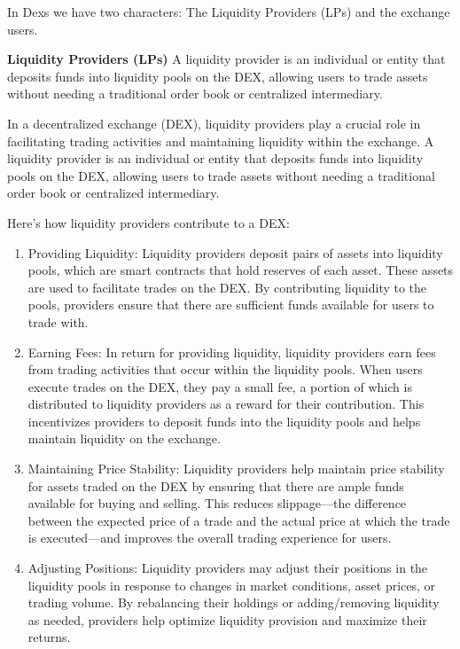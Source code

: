 \noindent In Dexs we have two characters: The Liquidity Providers (LPs) and the exchange users.

\textbf{Liquidity Providers (LPs)} A liquidity provider is an individual or entity that deposits funds into liquidity pools on the DEX, allowing users to trade assets without needing a traditional order book or centralized intermediary.

In a decentralized exchange (DEX), liquidity providers play a crucial role in facilitating trading activities and maintaining liquidity within the exchange. A liquidity provider is an individual or entity that deposits funds into liquidity pools on the DEX, allowing users to trade assets without needing a traditional order book or centralized intermediary.

Here's how liquidity providers contribute to a DEX:

\begin{enumerate}
  \item Providing Liquidity: Liquidity providers deposit pairs of assets into liquidity pools, which are smart contracts that hold reserves of each asset. These assets are used to facilitate trades on the DEX. By contributing liquidity to the pools, providers ensure that there are sufficient funds available for users to trade with.

  \item Earning Fees: In return for providing liquidity, liquidity providers earn fees from trading activities that occur within the liquidity pools. When users execute trades on the DEX, they pay a small fee, a portion of which is distributed to liquidity providers as a reward for their contribution. This incentivizes providers to deposit funds into the liquidity pools and helps maintain liquidity on the exchange.

  \item Maintaining Price Stability: Liquidity providers help maintain price stability for assets traded on the DEX by ensuring that there are ample funds available for buying and selling. This reduces slippage—the difference between the expected price of a trade and the actual price at which the trade is executed—and improves the overall trading experience for users.

  \item Adjusting Positions: Liquidity providers may adjust their positions in the liquidity pools in response to changes in market conditions, asset prices, or trading volume. By rebalancing their holdings or adding/removing liquidity as needed, providers help optimize liquidity provision and maximize their returns.
\end{enumerate}

